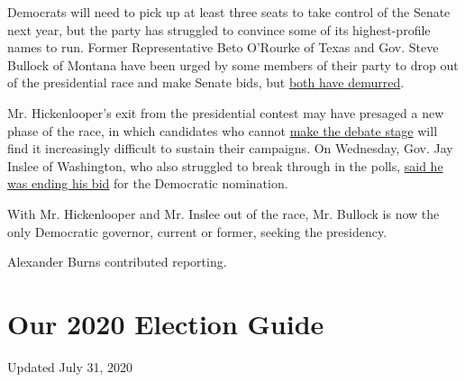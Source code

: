 Democrats will need to pick up at least three seats to take control of
the Senate next year, but the party has struggled to convince some of
its highest-profile names to run. Former Representative Beto O'Rourke of
Texas and Gov. Steve Bullock of Montana have been urged by some members
of their party to drop out of the presidential race and make Senate
bids, but
\href{https://www.nytimes.com/2019/08/16/us/politics/senate-hickenlooper-beto-abrams-bullock.html}{both
have demurred}.

Mr. Hickenlooper's exit from the presidential contest may have presaged
a new phase of the race, in which candidates who cannot
\href{https://www.nytimes.com/2019/08/21/us/politics/next-democratic-debate.html}{make
the debate stage} will find it increasingly difficult to sustain their
campaigns. On Wednesday, Gov. Jay Inslee of Washington, who also
struggled to break through in the polls,
\href{https://www.nytimes.com/2019/08/21/us/politics/jay-inslee-2020-campaign.html}{said
he was ending his bid} for the Democratic nomination.

With Mr. Hickenlooper and Mr. Inslee out of the race, Mr. Bullock is now
the only Democratic governor, current or former, seeking the presidency.

Alexander Burns contributed reporting.

\hypertarget{our-2020-election-guide}{%
\section{Our 2020 Election Guide}\label{our-2020-election-guide}}

Updated July 31, 2020

